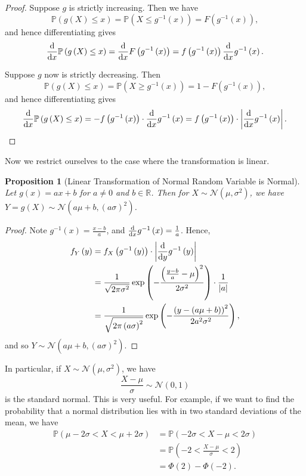 \documentclass[11pt]{article}
\numberwithin{equation}{section}
\newtheorem{proposition}[theorem]{Proposition}
\theoremstyle{definition}
\theoremstyle{remark}
\newcommand{\pqty}[1]{\left(#1\right)}
\newcommand{\abs}[1]{\left|#1\right|}
\newcommand{\RR}{\mathbb R}
\newcommand{\inverse}{^{-1}}
\newcommand{\Prob}{\mathbb P}
\newcommand{\sNormCdf}{\Phi}
\newcommand{\Normal}{\mathcal N}
\begin{document}
\begin{proof}\label{probability-proof-066}
    Suppose \(g\) is strictly increasing. Then we have
    \[
        \Prob\pqty{g\pqty{X} \leq x} = \Prob\pqty{X \leq g\inverse\pqty{x}} = F\pqty{g\inverse\pqty{x}},
    \]
    and hence differentiating gives
    \[
        \dv{x} \Prob\pqty{g \pqty{X} \leq x} = \dv{x} F\pqty{g\inverse\pqty{x}} = f\pqty{g\inverse\pqty{x}} \dv{x} g\inverse\pqty{x}.
    \]

    Suppose \(g\) now is strictly decreasing. Then
    \[
        \Prob\pqty{g\pqty{X} \leq x} = \Prob\pqty{X \geq g\inverse\pqty{x}} = 1 - F\pqty{g\inverse\pqty{x}},
    \]
    and hence differentiating gives
    \[
        \dv{x} \Prob\pqty{g\pqty{X} \leq x} = - f\pqty{g\inverse\pqty{x}} \cdot \dv{x} g\inverse\pqty{x} = f\pqty{g\inverse\pqty{x}} \cdot \abs{\dv{x} g\inverse\pqty{x}}.
    \]
\end{proof}

Now we restrict ourselves to the case where the transformation is linear.

\begin{proposition}[Linear Transformation of Normal Random Variable is Normal]\label{probability-proposition-036}
    \label{probability-prop:lin-transformatino-normal}%
    Let \(g\pqty{x} = ax + b\) for \(a \neq 0\) and \(b \in \RR\). Then for \(X \sim \Normal\pqty{\mu, \sigma^2}\), we have \(Y = g\pqty{X} \sim \Normal\pqty{a \mu + b, \pqty{a \sigma}^2}\).
\end{proposition}

\begin{proof}\label{probability-proof-067}
    Note \(g\inverse\pqty{x} = \frac{x - b}{a}\), and \(\dv{x} g\inverse\pqty{x} = \frac{1}{a}\). Hence,
    \begin{align*}
        f_Y\pqty{y} &= f_X\pqty{g\inverse\pqty{y}} \cdot \abs{\dv{y} g\inverse\pqty{y}} \\
        &= \frac{1}{\sqrt{2 \pi \sigma^2}} \exp\pqty{- \frac{\pqty{\frac{y - b}{a} - \mu}^2}{2 \sigma^2}} \cdot \frac{1}{\abs{a}} \\
        &= \frac{1}{\sqrt{2 \pi \pqty{a \sigma}^2}} \exp\pqty{- \frac{\pqty{y - \pqty{a\mu + b}}^2}{2 a^2 \sigma^2}},
    \end{align*}
    and so \(Y \sim \Normal\pqty{a \mu + b, \pqty{a \sigma}^2}\).
\end{proof}

In particular, if \(X \sim \Normal\pqty{\mu, \sigma^2}\), we have
\[
    \frac{X - \mu}{\sigma} \sim \Normal\pqty{0, 1}
\]
is the standard normal. This is very useful. For example, if we want to find the probability that a normal distribution lies with in two standard deviations of the mean, we have
\begin{align*}
    \Prob\pqty{\mu - 2 \sigma < X < \mu + 2 \sigma} &= \Prob\pqty{-2\sigma < X - \mu < 2\sigma} \\
    &= \Prob\pqty{-2 < \frac{X - \mu}{\sigma} < 2} \\
    &= \sNormCdf\pqty{2} - \sNormCdf\pqty{-2}.
\end{align*}
\end{document}

